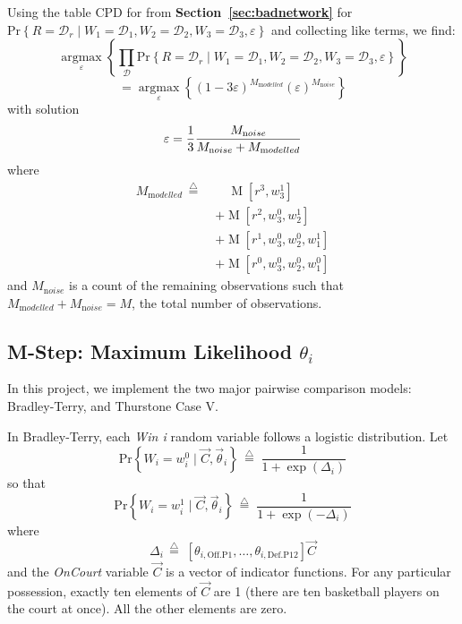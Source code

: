 \documentclass[10pt,twocolumn]{article}
\newcommand{\argmax}[2]{\ensuremath{   \underset{#1}{\operatorname{argmax}} \left\{ #2 \right\}  }}
\newcommand{\prb}[1]{\ensuremath{  \mathrm{Pr}\left\{ #1 \right\}  }}
\newcommand{\tridefeq}{\ensuremath{  \,{\overset{\triangle}{=}}\;   }}
\begin{document}
Using the table CPD for from {\bf Section~\ref{sec:badnetwork}} for $ \prb{R = \mathcal{D}_r \mid W_1 = \mathcal{D}_1, W_2 = \mathcal{D}_2, W_3 = \mathcal{D}_3, \varepsilon}$ and collecting like terms, we find:
\[
\argmax{\varepsilon}{ \prod_{\mathcal{D}} \prb{R = \mathcal{D}_r \mid W_1 = \mathcal{D}_1, W_2 = \mathcal{D}_2, W_3 = \mathcal{D}_3, \varepsilon}  }
\]%
\[
= \argmax{\varepsilon}{ \left(1-3\varepsilon\right)^{M_{\mathrm modelled}} \left(\varepsilon\right)^{M_{\mathrm noise}} }
\]%
with solution
\[
\varepsilon = {1 \over 3} \frac{M_{\mathrm noise}}{M_{\mathrm noise} + M_{\mathrm modelled}}
\]%
where
\begin{align*}
 M_{\mathrm modelled} \tridefeq
   &\quad \operatorname{M}\left[ r^3, w_3^1 \right]
\\ &+ \operatorname{M}\left[ r^2, w_3^0, w_2^1 \right]
\\ &+ \operatorname{M}\left[ r^1, w_3^0, w_2^0, w_1^1 \right]
\\ &+ \operatorname{M}\left[ r^0, w_3^0, w_2^0, w_1^0 \right]
\end{align*}%
and $ M_{\mathrm noise}$ is a count of the remaining observations such that $M_{\mathrm modelled} + M_{\mathrm noise} = M$, the total number of observations.


\subsection{M-Step: Maximum Likelihood $\theta_i$}

In this project, we implement the two major pairwise comparison models: Bradley-Terry, and Thurstone Case V.

In Bradley-Terry, each \emph{Win i} random variable follows a logistic distribution.
Let
\[
\prb{W_i = w_i^0 \mid \vec C, \vec \theta_i}
 \tridefeq \frac{1}
{1 + \exp\left(\Delta_i \right) }
\]%
so that
\[
\prb{W_i = w_i^1 \mid \vec C, \vec \theta_i}
 \tridefeq \frac{1}
{1 + \exp\left(- \Delta_i \right) }
\]%
where
\[
\Delta_i \tridefeq
   \left[ \theta_{i,\mathrm{Off.P1}}, \ldots
,\theta_{i,\mathrm{Def.P12}} 
\right] \vec C 
\]%
and the \emph{OnCourt} variable $\vec C$ is a vector of indicator functions. For any particular possession, exactly ten elements of $\vec C$ are 1 (there are ten basketball players on the court at once). All the other elements are zero.
\end{document}
